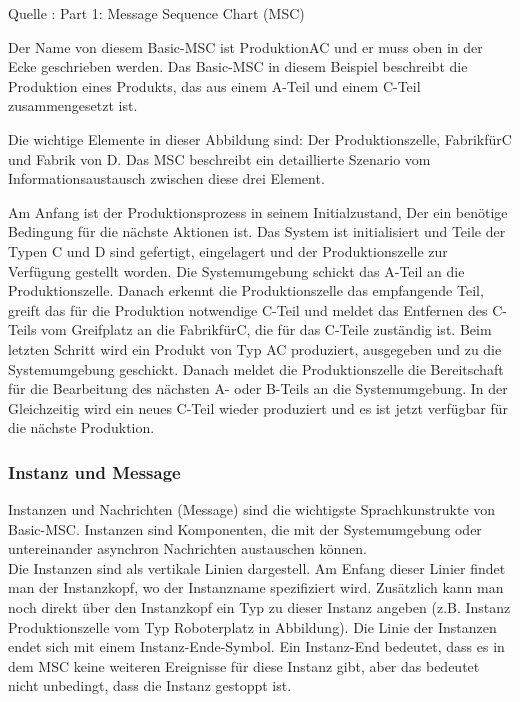 

Quelle : \cite{MT009}
Part 1: Message Sequence Chart (MSC) 

 

Der Name von diesem Basic-MSC ist ProduktionAC und er muss oben in der Ecke geschrieben werden. Das Basic-MSC in diesem Beispiel beschreibt die Produktion eines Produkts, das aus einem A-Teil und einem C-Teil zusammengesetzt ist.

Die wichtige Elemente in dieser Abbildung sind: Der Produktionszelle, FabrikfürC und Fabrik von D. Das MSC beschreibt ein detaillierte Szenario vom Informationsaustausch zwischen diese drei Element. 

Am Anfang ist der Produktionsprozess in seinem Initialzustand, Der ein benötige Bedingung für die nächste Aktionen ist. 
 Das System ist initialisiert und Teile
der Typen C und D sind gefertigt, eingelagert und der
Produktionszelle zur Verfügung gestellt worden.
 Die Systemumgebung schickt das A-Teil an die Produktionszelle.
 Danach erkennt die Produktionszelle das empfangende Teil, greift das für die Produktion notwendige C-Teil und meldet das Entfernen des
 C-Teils vom Greifplatz an die FabrikfürC, die für das C-Teile zuständig ist. 
 Beim letzten Schritt wird ein Produkt von Typ AC produziert, ausgegeben und zu die Systemumgebung geschickt.
Danach meldet die Produktionszelle die Bereitschaft
für die Bearbeitung des nächsten A- oder B-Teils
an die Systemumgebung.
In der Gleichzeitig wird ein neues C-Teil wieder produziert und es ist jetzt verfügbar für die nächste Produktion.

\subsubsection{Instanz und Message}
Instanzen und Nachrichten (Message) sind die wichtigste Sprachkunstrukte von Basic-MSC.
Instanzen sind Komponenten, die mit der Systemumgebung oder untereinander
asynchron Nachrichten austauschen können\cite{MT009}.\\
Die Instanzen sind als vertikale Linien dargestell. Am Enfang dieser Linier findet man der Instanzkopf, wo der Instanzname spezifiziert wird. Zusätzlich kann man noch direkt über den Instanzkopf ein Typ zu dieser Instanz angeben (z.B. Instanz Produktionszelle vom Typ Roboterplatz in Abbildung).
Die Linie der Instanzen endet sich mit einem Instanz-Ende-Symbol. Ein Instanz-End bedeutet, dass es in dem MSC keine weiteren Ereignisse für diese Instanz gibt, aber das bedeutet nicht unbedingt, dass die Instanz gestoppt ist.\\


